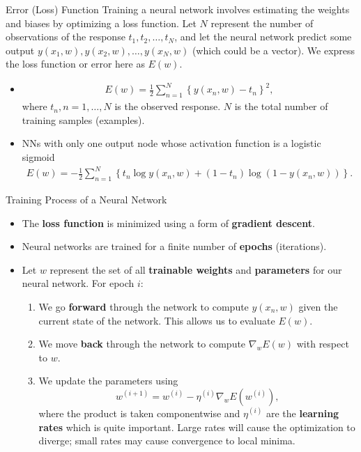 \documentclass[10pt, hyperref={colorlinks = true,linkcolor = blue}]{beamer}
\begin{document}
{{{\begin{frame}{Error (Loss) Function}
  Training a neural network involves estimating the weights and biases by optimizing a loss function. Let \( N \) represent the number of observations of the response \( t_1, t_2, \ldots, t_N \), and let the neural network predict some output \( {y}(x_1, w), {y}(x_2, w), \ldots, {y}(x_N, w) \) (which could be a vector). We express the loss function or error here as \( E(w) \).
 \begin{itemize}[<+->]
\item {\color{purple}{Regression:}} {\color{red}{Sum of squared}} 
\begin{align*}
E( w) = \frac{1}{2} \sum_{n=1}^{N} \left\{y(x_n, w)- t_n\right\}^2,
\end{align*}
where $t_n, n=1,\ldots,N$ is the observed response. $N$ is the total number of training samples (examples).
\item {\color{purple}{Binary classification:}} NNs with only one output node whose activation function is a logistic sigmoid {\color{red}{Cross-entropy error function}} 
\begin{align*}
E(w) = -\frac{1}{2} \sum_{n=1}^{N} \left\{ t_n\log y( x_n, w) + (1-t_n) \log(1 - y( x_n, w)) \right\}. 
\end{align*}
\end{itemize}
\end{frame}


\begin{frame}{Training Process of a Neural Network}
 \begin{itemize}[<+->]
        \item The \textbf{loss function} is minimized using a form of \textbf{gradient descent}.
        \item Neural networks are trained for a finite number of \textbf{epochs} (iterations).
        \item Let \( w \) represent the set of all \textbf{trainable weights} and \textbf{parameters} for our neural network. For epoch \( i \):
        \begin{enumerate}
            \item We go \textbf{forward} through the network to compute \( y(x_n, w) \) given the current state of the network. This allows us to evaluate \( E(w) \).
            \item We move \textbf{back} through the network to compute \( \nabla_{w} E(w) \) with respect to \(w\).
            \item We update the parameters using
            \[
            w^{(i+1)} = w^{(i)} - \eta^{(i)} \nabla_{w} E(w^{(i)}),
            \]
            where the product is taken componentwise and \( \eta^{(i)} \) are the \textbf{learning rates} which is quite important. Large rates will cause the
optimization to diverge; small rates may cause convergence to local minima.
        \end{enumerate}
    \end{itemize}
\end{frame}



}}}
\end{document}
